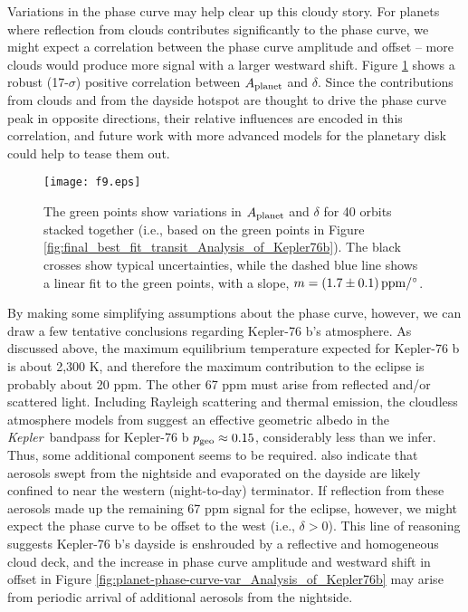 \documentclass[manuscript]{aastex62}
\newcommand{\kepler}{{\it Kepler}}
\begin{document}
Variations in the phase curve may help clear up this cloudy story. For planets where reflection from clouds contributes significantly to the phase curve, we might expect a correlation between the phase curve amplitude and offset -- more clouds would produce more signal with a larger westward shift. Figure \ref{fig:Aplanet-delta-var_Analysis_of_Kepler76b} shows a robust (17-$\sigma$) positive correlation between $A_{\rm planet}$ and $\delta$. Since the contributions from clouds and from the dayside hotspot are thought to drive the phase curve peak in opposite directions, their relative influences are encoded in this correlation, and future work with more advanced models for the planetary disk \citep[e.g.,][]{2017ascl.soft11019L} could help to tease them out.

\begin{figure}
\texttt{[image: f9.eps]}
\caption{The green points show variations in $A_{\rm planet}$ and $\delta$ for 40 orbits stacked together (i.e., based on the green points in Figure \ref{fig:final_best_fit_transit_Analysis_of_Kepler76b}). The black crosses show typical uncertainties, while the dashed blue line shows a linear fit to the green points, with a slope, $m = \left( 1.7 \pm 0.1 \right) {\rm ppm/^\circ}$. \label{fig:Aplanet-delta-var_Analysis_of_Kepler76b}}
\end{figure}

By making some simplifying assumptions about the phase curve, however, we can draw a few tentative conclusions regarding Kepler-76 b's atmosphere. As discussed above, the maximum equilibrium temperature expected for Kepler-76 b is about 2,300 K, and therefore the maximum contribution to the eclipse is probably about 20 ppm. The other 67 ppm must arise from reflected and/or scattered light. Including Rayleigh scattering and thermal emission, the cloudless atmosphere models from \citet{2016ApJ...828...22P} suggest an effective geometric albedo in the \kepler\ bandpass for Kepler-76 b $p_{\rm geo} \approx 0.15$, considerably less than we infer. Thus, some additional component seems to be required. \citet{2016ApJ...828...22P} also indicate that aerosols swept from the nightside and evaporated on the dayside are likely confined to near the western (night-to-day) terminator. If reflection from these aerosols made up the remaining 67 ppm signal for the eclipse, however, we might expect the phase curve to be offset to the west (i.e., $\delta > 0$). This line of reasoning suggests Kepler-76 b's dayside is enshrouded by a reflective and homogeneous cloud deck, and the increase in phase curve amplitude and westward shift in offset in Figure \ref{fig:planet-phase-curve-var_Analysis_of_Kepler76b} may arise from periodic arrival of additional aerosols from the nightside.
\end{document}
